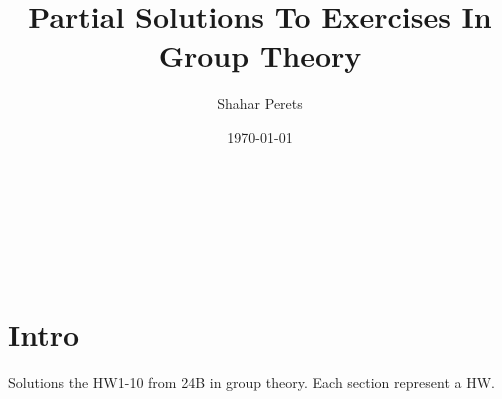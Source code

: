 \documentclass[a4paper]{article}
\author{Shahar Perets}
\title{Partial Solutions To Exercises In Group Theory}
\date{\today}
\begin{document}
	\huge {\huge\,\\ \vfil {\begin{center}
				\thetitle \\
				\vspace{10pt}
				\large \theauthor \\
				\vspace{3pt}
				\large \thedate
		\end{center}} \vfil	}
	\normalsize
	
	\pagebreak
	
	\section*{Intro}
	Solutions the HW1-10 from 24B in group theory. Each section represent a HW. 


	\tableofcontents
	
	
\end{document}
